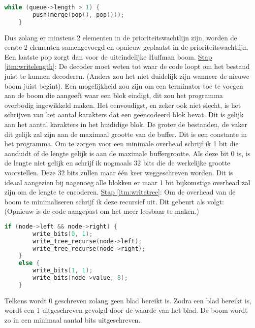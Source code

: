 \documentclass[11pt, a4paper]{article}
\begin{document}
\begin{lstlisting}[language=C]
	while (queue->length > 1) {
		push(merge(pop(), pop()));
	}
\end{lstlisting}
Dus zolang er minstens 2 elementen in de prioriteitswachtlijn zijn, worden de eerste 2 elementen samengevoegd en opnieuw geplaatst in de prioriteitswachtlijn. Een laatste pop zorgt dan voor de uiteindelijke Huffman boom.
\newline\underline{Stap \ref{itm:writelength}}: 
De decoder moet weten tot waar de code loopt om het bestand juist te kunnen decoderen. (Anders zou het niet duidelijk zijn wanneer de nieuwe boom juist begint). Een mogelijkheid zou zijn om een terminator toe te voegen aan de boom die aangeeft waar een blok eindigt, dit zou het programma overbodig ingewikkeld maken. Het eenvoudigst, en zeker ook niet slecht, is het schrijven van het aantal karakters dat een ge\"{e}ncodeerd blok bevat. Dit is gelijk aan het aantal karakters in het huididige blok. De groter de bestanden, de vaker dit gelijk zal zijn aan de maximaal grootte van de buffer. Dit is een constante in het programma. Om te zorgen voor een minimale overhead schrijf ik 1 bit die aanduidt of de lengte gelijk is aan de maximale buffergrootte. Als deze bit 0 is, is de lengte niet gelijk en schrijf ik nogmaals 32 bits die de werkelijke grootte voorstellen. Deze 32 bits zullen maar \'{e}\'{e}n keer weggeschreven worden. Dit is ideaal aangezien bij nagenoeg alle blokken er maar 1 bit bijkomstige overhead zal zijn om de lengte te encoderen. 
\newline\underline{Stap \ref{itm:writetree}}: Om de overhead van de boom te minimaliseren schrijf ik deze recursief uit. Dit gebeurt als volgt: (Opnieuw is de code aangepast om het meer leesbaar te maken.)
\begin{lstlisting}[language=C]
	if (node->left && node->right) {
		write_bits(0, 1);
		write_tree_recurse(node->left);
		write_tree_recurse(node->right);
	}
	else {
		write_bits(1, 1);
		write_bits(node->value, 8);
	}
\end{lstlisting}
Telkens wordt 0 geschreven zolang geen blad bereikt is. Zodra een blad bereikt is, wordt een 1 uitgeschreven gevolgd door de waarde van het blad. 
De boom wordt zo in een minimaal aantal bits uitgeschreven. 
\end{document}
